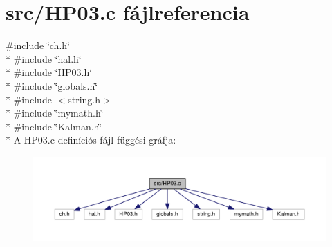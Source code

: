 \section{src/\-H\-P03.c fájlreferencia}
\label{_h_p03_8c}
{\ttfamily \#include \char`\"{}ch.\-h\char`\"{}}\\*
{\ttfamily \#include \char`\"{}hal.\-h\char`\"{}}\\*
{\ttfamily \#include \char`\"{}H\-P03.\-h\char`\"{}}\\*
{\ttfamily \#include \char`\"{}globals.\-h\char`\"{}}\\*
{\ttfamily \#include $<$string.\-h$>$}\\*
{\ttfamily \#include \char`\"{}mymath.\-h\char`\"{}}\\*
{\ttfamily \#include \char`\"{}Kalman.\-h\char`\"{}}\\*
A H\-P03.\-c definíciós fájl függési gráfja\-:
\nopagebreak
\begin{figure}[H]
\begin{center}
\leavevmode
\includegraphics[width=350pt]{_h_p03_8c__incl}
\end{center}
\end{figure}
